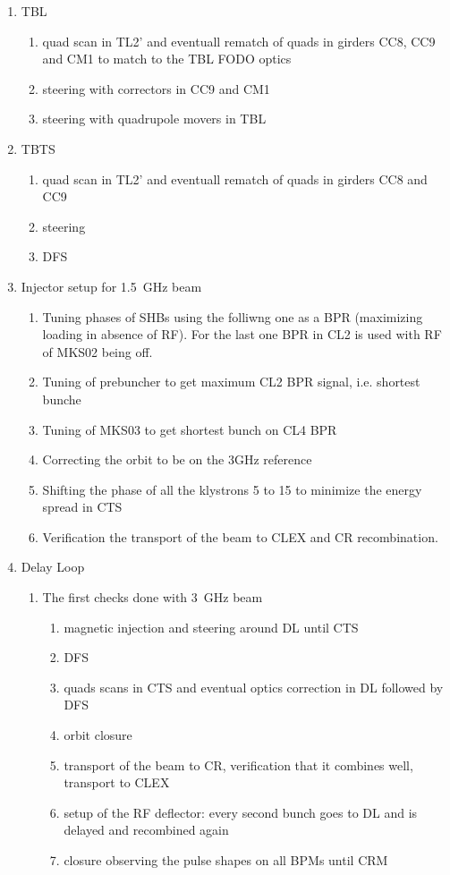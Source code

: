 \begin{enumerate}
\item TBL
  \begin{enumerate}
    \item quad scan in TL2' and eventuall rematch of quads in girders 
          CC8, CC9 and CM1 to match to the TBL FODO optics
    \item steering with correctors in CC9 and CM1
    \item steering with quadrupole movers in TBL
  \end{enumerate}

\item TBTS
  \begin{enumerate}
    \item quad scan in TL2' and eventuall rematch of quads in girders CC8 and CC9
    \item steering 
    \item DFS
  \end{enumerate}

\item Injector setup for 1.5~GHz beam
  \begin{enumerate}
    \item Tuning phases of SHBs using the folliwng one as a BPR (maximizing loading in absence of RF).
          For the last one BPR in CL2 is used with RF of MKS02 being off.
    \item Tuning of prebuncher to get maximum CL2 BPR signal, i.e. shortest bunche
    \item Tuning of MKS03 to get shortest bunch on CL4 BPR
    \item Correcting the orbit to be on the 3GHz reference
    \item Shifting the phase of all the klystrons 5 to 15 to minimize the energy spread in CTS
    \item Verification the transport of the beam to CLEX and CR recombination.
  \end{enumerate}

\item Delay Loop 
  \begin{enumerate}
     \item The first checks done with 3~GHz beam
     \begin{enumerate}
        \item magnetic injection and steering around DL until CTS
        \item DFS
        \item quads scans in CTS and eventual optics correction in DL followed by DFS
        \item orbit closure
        \item transport of the beam to CR, verification that it combines well, transport to CLEX
        \item setup of the RF deflector: 
              every second bunch goes to DL and is delayed and recombined again
        \item closure observing the pulse shapes on all BPMs until CRM
     \end{enumerate}


\end{enumerate}
\end{enumerate}

